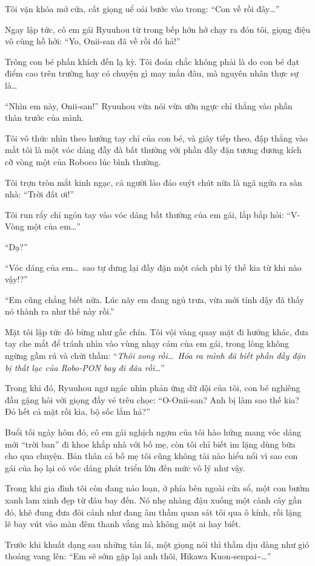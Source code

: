 \documentclass[../main.tex]{subfiles}
\begin{document}
Tôi vặn khóa mở cửa, cất giọng uể oải bước vào trong:
``Con về rồi đây\dots''

Ngay lập tức, cô em gái Ryuuhou từ trong bếp hớn hở chạy ra đón tôi, giọng điệu vô cùng hồ hởi: ``Yo, Onii-san đã về rồi đó hả!''

Trông con bé phấn khích đến lạ kỳ. Tôi đoán chắc không phải là do con bé đạt điểm cao trên trường hay có chuyện gì may mắn đâu, mà nguyên nhân thực sự là\dots

``Nhìn em này, Onii-san!'' Ryuuhou vừa nói vừa ưỡn ngực chỉ thẳng vào phần thân trước của mình.

Tôi vô thức nhìn theo hướng tay chỉ của con bé, và giây tiếp theo, đập thẳng vào mắt tôi là một vóc dáng đẫy đà bất thường với phần đầy đặn tương đương kích cỡ vòng một của Roboco lúc bình thường.

Tôi trợn tròn mắt kinh ngạc, cả người lảo đảo suýt chút nữa là ngã ngửa ra sàn nhà: ``Trời đất ơi!''

Tôi run rẩy chỉ ngón tay vào vóc dáng bất thường của em gái, lắp bắp hỏi:
``V-Vòng một của em\dots''

``Dạ?''

``Vóc dáng của em\dots\ sao tự dưng lại đầy đặn một cách phi lý thế kia từ khi nào vậy!?''

``Em cũng chẳng biết nữa. Lúc nãy em đang ngủ trưa, vừa mới tỉnh dậy đã thấy nó thành ra như thế này rồi.''

Mặt tôi lập tức đỏ bừng như gấc chín. Tôi vội vàng quay mặt đi hướng khác, đưa tay che mắt để tránh nhìn vào vùng nhạy cảm của em gái, trong lòng không ngừng gầm rú và chửi thầm: ``\textit{Thôi xong rồi\dots\ Hóa ra mình đã biết phần đầy đặn bị thất lạc của Robo-PON bay đi đâu rồi\dots}''

Trong khi đó, Ryuuhou ngơ ngác nhìn phản ứng dữ dội của tôi, con bé nghiêng đầu gặng hỏi với giọng đầy vẻ trêu chọc:
``O-Onii-san? Anh bị làm sao thế kia? Đỏ hết cả mặt rồi kìa, bộ sốc lắm hả?''

Buổi tối ngày hôm đó, cô em gái nghịch ngợm của tôi hào hứng mang vóc dáng mới ``trời ban'' đi khoe khắp nhà với bố mẹ, còn tôi chỉ biết im lặng dùng bữa cho qua chuyện. Bản thân cả bố mẹ tôi cũng không tài nào hiểu nổi vì sao con gái của họ lại có vóc dáng phát triển lớn đến mức vô lý như vậy.

\il

Trong khi gia đình tôi còn đang náo loạn, ở phía bên ngoài cửa sổ, một con bướm xanh lam xinh đẹp từ đâu bay đến. Nó nhẹ nhàng đậu xuống một cành cây gần đó, khẽ đung đưa đôi cánh như đang âm thầm quan sát tôi qua ô kính, rồi lặng lẽ bay vút vào màn đêm thanh vắng mà không một ai hay biết.

Trước khi khuất dạng sau những tán lá, một giọng nói thì thầm dịu dàng như gió thoảng vang lên:
``Em sẽ sớm gặp lại anh thôi, Hikawa Kuon-senpai\~{}\dots''
\end{document}
